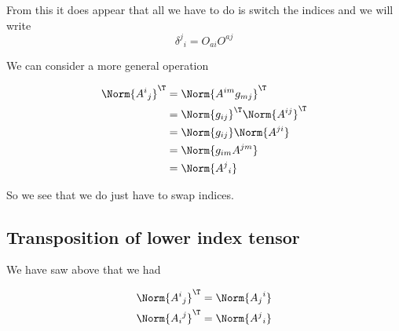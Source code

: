 From this it does appear that all we have to do is switch the indices and we will write
\begin{equation}\label{eqn:relativisticElectrodynamicsL11:1060b}
{\delta^j}_i = O_{a i} O^{a j} 
\end{equation}

We can consider a more general operation

\begin{equation}\label{eqn:relativisticElectrodynamicsL11b:1460}
\begin{aligned}
\Norm{{A^i}_j}^\T
&=
\Norm{ A^{i m} g_{m j} }^\T \\
&=
\Norm{ g_{i j} }^\T
\Norm{ A^{i j} }^\T 
 \\
&=
\Norm{ g_{i j} }
\Norm{ A^{j i} }
 \\
&=
\Norm{ g_{i m} A^{j m} }
 \\
&=
\Norm{ {A^{j}}_i }
\end{aligned}
\end{equation}

So we see that we do just have to swap indices.

%
%
%
%

\subsection{Transposition of lower index tensor}

We have saw above that we had

\begin{equation}\label{eqn:relativisticElectrodynamicsL11:1022}
\begin{aligned}
\Norm{ {A^{i}}_j }^\T &= \Norm{ {A_{j}}^i } \\
\Norm{ {A_{i}}^j }^\T &= \Norm{ {A^{j}}_i } 
\end{aligned}
\end{equation}

